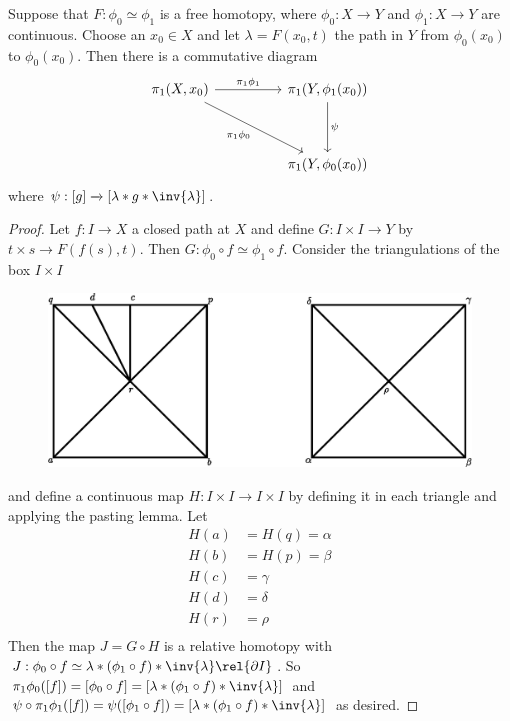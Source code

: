 \begin{lemma}\label{4.2.5}
    Suppose that $F:\phi_0 \simeq \phi_1$ is a free homotopy, where $\phi_0:X
    \xrightarrow{} Y$ and $\phi_1:X \xrightarrow{} Y$ are continuous. Choose an
    $x_0 \in X$ and let $\lambda=F(x_0,t)$ the path in $Y$ from $\phi_0(x_0)$ to
    $\phi_0(x_0)$. Then there is a commutative diagram
    \[\begin{tikzcd}
        {\pi_1(X,x_0)} && {\pi_1(Y,\phi_1(x_0))} \\
        \\
        && {\pi_1(Y,\phi_0(x_0))}
        \arrow["{\pi_1{\phi_1}}", from=1-1, to=1-3]
        \arrow["\psi", from=1-3, to=3-3]
        \arrow["{\pi_1{\phi_0}}"', from=1-1, to=3-3]
    \end{tikzcd}\]
    where $\psi:[g] \xrightarrow{} [\lambda \ast g \ast \inv{\lambda}]$.
\end{lemma}
\begin{proof}
    Let $f:I \xrightarrow{} X$ a closed path at $X$ and define  $G:I \times I
    \xrightarrow{} Y$ by $t \times s \xrightarrow{} F(f(s),t)$. Then $G:\phi_0
    \circ f \simeq \phi_1 \circ f$. Consider the triangulations of the box $I
    \times I$
     \begin{figure}[h]
        \centering
        \includegraphics[scale=0.8]{Figures/chapter4/affine_box.eps}
        \caption{}
        \label{}
    \end{figure}
    and define a continuous map $H:I \times I \xrightarrow{} I \times I$ by
    defining it in each triangle and applying the pasting lemma. Let
    \begin{align*}
        H(a)    &=  H(q)=\alpha \\
        H(b)    &=  H(p)=\beta \\
        H(c)    &=  \gamma \\
        H(d)    &=  \delta \\
        H(r)    &=  \rho \\
    \end{align*}
    Then the map $J=G \circ  H$ is a relative homotopy with  $J:\phi_0 \circ f
    \simeq \lambda \ast (\phi_1 \circ f) \ast \inv{\lambda} \rel{\partial{I}}$.
    So $\pi_1{\phi_0}([f])=[\phi_0 \circ f]=[\lambda \ast (\phi_1 \circ f) \ast
    \inv{\lambda}]$ and $\psi \circ \pi_1{\phi_1}([f])=\psi([\phi_1 \circ
f])=[\lambda \ast (\phi_1 \circ f) \ast \inv{\lambda}]$ as desired.
\end{proof}
